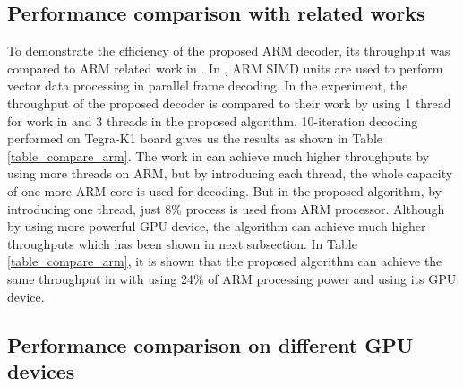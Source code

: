 \documentclass[conference]{IEEEtran}
\begin{document}
\subsection{Performance comparison with related works}
To demonstrate the efficiency of the proposed ARM decoder, its throughput was compared to ARM related work in \cite{art_neon}. In \cite{art_neon}, ARM SIMD units are used to perform vector data processing in parallel frame decoding. In the experiment, the throughput of the proposed decoder is compared to their work by using 1 thread for work in \cite{art_neon} and 3 threads in the proposed algorithm. 10-iteration decoding performed on Tegra-K1 board gives us the results as shown in Table \ref{table_compare_arm}. The work in \cite{art_neon} can achieve much higher throughputs by using more threads on ARM, but by introducing each thread, the whole capacity of one more ARM core is used for decoding. But in the proposed algorithm, by introducing one thread, just 8\% process is used from ARM processor. Although by using more powerful GPU device, the algorithm can achieve much higher throughputs which has been shown in next subsection. In Table \ref{table_compare_arm}, it is shown that the proposed algorithm can achieve the same throughput in \cite{art_neon} with using 24\% of ARM processing power and using its GPU device. 
\begin{table}[h]
\centering
\caption{Throughput (Mbps) Comparison With Related Work} \label{table_compare_arm}
\end{table}

\subsection{Performance comparison on different GPU devices}
\end{document}
